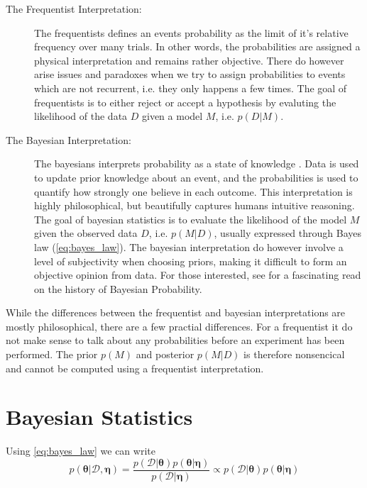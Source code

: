 \begin{description}
    \item[The Frequentist Interpretation:] The frequentists defines an events probability as the limit of it's relative frequency over many trials. In other words, the probabilities are assigned a physical interpretation and remains rather objective. There do however arise issues and paradoxes when we try to assign probabilities to events which are not recurrent, i.e. they only happens a few times. The goal of frequentists is to either reject or accept a hypothesis by evaluting the likelihood of the data $D$ given a model $M$, i.e. $p(D | M)$. 
    \item[The Bayesian Interpretation:] The bayesians interprets probability as a state of knowledge \cite{Jaynes86bayesianmethods:}. Data is used to update prior knowledge about an event, and the probabilities is used to quantify how strongly one believe in each outcome. This interpretation is highly philosophical, but beautifully captures humans intuitive reasoning. The goal of bayesian statistics is to evaluate the likelihood of the model $M$ given the observed data $D$, i.e. $p(M | D)$, usually expressed through Bayes law (\cref{eq:bayes_law}). The bayesian interpretation do however involve a level of subjectivity when choosing priors, making it difficult to form an objective opinion from data. For those interested, see \Cite{Jaynes86bayesianmethods:} for a fascinating read on the history of Bayesian Probability.
\end{description}

While the differences between the frequentist and bayesian interpretations are mostly philosophical, there are a few practial differences. For a frequentist it do not make sense to talk about any probabilities before an experiment has been performed. The prior $p(M)$ and posterior $p(M | D)$ is therefore nonsencical and cannot be computed using a frequentist interpretation.     





\section{Bayesian Statistics}

Using \cref{eq:bayes_law} we can write 
\begin{equation}\label{eq:bayes_learning}
    p(\boldsymbol{\theta}| \mathcal{D}, \boldsymbol{\eta}) = \frac{p(\mathcal{D} | \boldsymbol{\theta}) p(\boldsymbol{\theta} | \boldsymbol{\eta})}{p(\mathcal{D} | \boldsymbol{\eta})} \propto p(\mathcal{D} | \boldsymbol{\theta})p(\boldsymbol{\theta} | \boldsymbol{\eta})
\end{equation}

